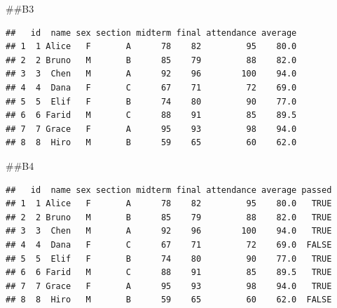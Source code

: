 \documentclass[
]{article}
\newenvironment{Shaded}{\begin{snugshade}}{\end{snugshade}}
\newcommand{\DecValTok}[1]{\textcolor[rgb]{0.00,0.00,0.81}{#1}}
\newcommand{\FunctionTok}[1]{\textcolor[rgb]{0.13,0.29,0.53}{\textbf{#1}}}
\newcommand{\NormalTok}[1]{#1}
\newcommand{\OtherTok}[1]{\textcolor[rgb]{0.56,0.35,0.01}{#1}}
\newcommand{\SpecialCharTok}[1]{\textcolor[rgb]{0.81,0.36,0.00}{\textbf{#1}}}
\begin{document}
\#\#B3

\begin{Shaded}
\end{Shaded}

\begin{verbatim}
##   id  name sex section midterm final attendance average
## 1  1 Alice   F       A      78    82         95    80.0
## 2  2 Bruno   M       B      85    79         88    82.0
## 3  3  Chen   M       A      92    96        100    94.0
## 4  4  Dana   F       C      67    71         72    69.0
## 5  5  Elif   F       B      74    80         90    77.0
## 6  6 Farid   M       C      88    91         85    89.5
## 7  7 Grace   F       A      95    93         98    94.0
## 8  8  Hiro   M       B      59    65         60    62.0
\end{verbatim}

\#\#B4

\begin{Shaded}
\end{Shaded}

\begin{verbatim}
##   id  name sex section midterm final attendance average passed
## 1  1 Alice   F       A      78    82         95    80.0   TRUE
## 2  2 Bruno   M       B      85    79         88    82.0   TRUE
## 3  3  Chen   M       A      92    96        100    94.0   TRUE
## 4  4  Dana   F       C      67    71         72    69.0  FALSE
## 5  5  Elif   F       B      74    80         90    77.0   TRUE
## 6  6 Farid   M       C      88    91         85    89.5   TRUE
## 7  7 Grace   F       A      95    93         98    94.0   TRUE
## 8  8  Hiro   M       B      59    65         60    62.0  FALSE
\end{verbatim}
\end{document}
